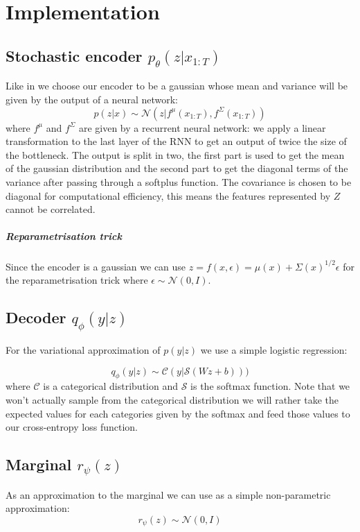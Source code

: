 \documentclass[10pt,oneside,openright]{report}
\begin{document}
\chapter{Implementation}
\section{Stochastic encoder $p_\theta(z|x_{1:T})$}
Like in \cite{vib} we choose our encoder to be a gaussian whose mean and variance will be given by the output of a neural network:
$$ p(z|x) \sim \mathcal{N}(z | f^\mu(x_{1:T}), f^\Sigma(x_{1:T}))$$ where $f^\mu$ and $f^\Sigma$ are given by a recurrent neural network: we apply a linear transformation to the last layer of the RNN to get an output of twice the size of the bottleneck. The output is split in two, the first part is used to get the mean of the gaussian distribution and the second part to get the diagonal terms of the variance after passing through a softplus function. The covariance is chosen to be diagonal for computational efficiency, this means the features represented by $Z$ cannot be correlated.

\paragraph{Reparametrisation trick}
Since the encoder is a gaussian we can use  $z = f(x, \epsilon) =  \mu(x) + \Sigma(x)^{1/2} \epsilon$ for the reparametrisation trick where $\epsilon \sim \mathcal{N}(0, I)$. 
 
\section{Decoder $q_\phi(y|z)$}
For the variational approximation of $p(y|z)$ we use a simple logistic regression:

$$ q_\phi(y|z) \sim \mathcal{C}(y| \mathcal{S}(Wz + b)))$$ where $\mathcal{C}$ is a categorical distribution and $\mathcal{S}$ is the softmax function. Note that we won't actually sample from the categorical distribution we will rather take the expected values for each categories given by the softmax and feed those values to our cross-entropy loss function.

\section{Marginal $r_\psi(z)$}

As an approximation to the marginal we can use as a simple non-parametric approximation:
$$r_\psi(z) \sim \mathcal{N}(0, I)$$
\end{document}
